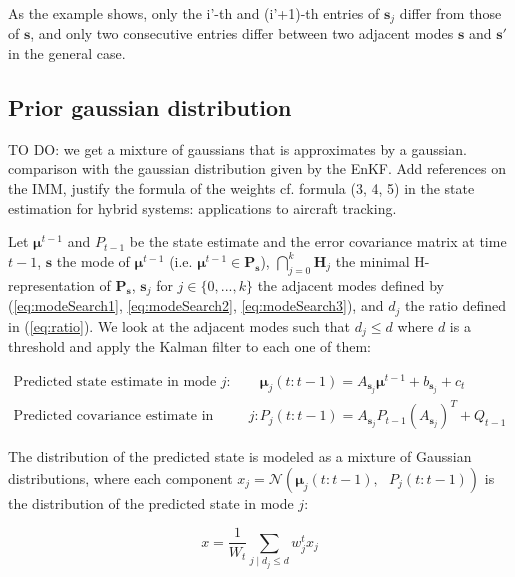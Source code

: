 \documentclass[11pt]{article}
\numberwithin{equation}{section}
\numberwithin{figure}{section}
\numberwithin{table}{section}
\begin{document}
As the example shows, only the i'-th and (i'+1)-th entries of $\boldsymbol s_{j}$ differ from those of $\boldsymbol s$, and only two consecutive entries differ between two adjacent modes $\boldsymbol s$ and $\boldsymbol s'$ in the general case.


\subsection{Prior gaussian distribution}

TO DO: we get a mixture of gaussians that is approximates by a gaussian. comparison with the gaussian distribution given by the EnKF. Add references on the IMM, justify the formula of the weights cf. formula (3, 4, 5) in the state estimation for hybrid systems: applications to aircraft tracking.

Let $\boldsymbol\mu^{t-1}$ and $P_{t-1}$ be the state estimate and the error covariance matrix at time $t-1$, $\boldsymbol s$ the mode of $\boldsymbol\mu^{t-1}$ (i.e. $\boldsymbol\mu^{t-1}\in \textbf{P}_{\boldsymbol s}$), $\bigcap_{j=0}^{k} \textbf{H}_{j}$ the minimal H-representation of $\textbf{P}_{\boldsymbol s}$, $\boldsymbol s_{j}$ for $j\in\{0,...,k\}$ the adjacent modes defined by (\ref{eq:modeSearch1}, \ref{eq:modeSearch2}, \ref{eq:modeSearch3}), and $d_{j}$ the ratio defined in (\ref{eq:ratio}). We look at the adjacent modes such that $d_{j}\leq d$ where $d$ is a threshold and apply the Kalman filter to each one of them:

\begin{equation}
\begin{array}{ll}
\text{Predicted state estimate in mode $j$: } & \boldsymbol\mu_{j}(t:t-1) = A_{\boldsymbol s_{j}} \boldsymbol\mu^{t-1} + b_{\boldsymbol s_{j}} + c_{t}\\
\text{Predicted covariance estimate in mode $j$: } & P_{j}(t:t-1) = A_{\boldsymbol s_{j}}P_{t-1}(A_{\boldsymbol s_{j}})^{T} + Q_{t-1}
\end{array}
\label{eq:mixture1}
\end{equation}

\noindent The distribution of the predicted state is modeled as a mixture of Gaussian distributions, where each component $x_{j}=\mathcal{N}(\boldsymbol\mu_{j}(t:t-1), \text{ }P_{j}(t:t-1))$ is the distribution of the predicted state in mode $j$:

\begin{equation}
x = \frac{1}{W_{t}}\sum_{j\mid d_{j}\leq d}{w_{j}^{t}x_{j}}
\label{eq:mixture2}
\end{equation}
\end{document}
